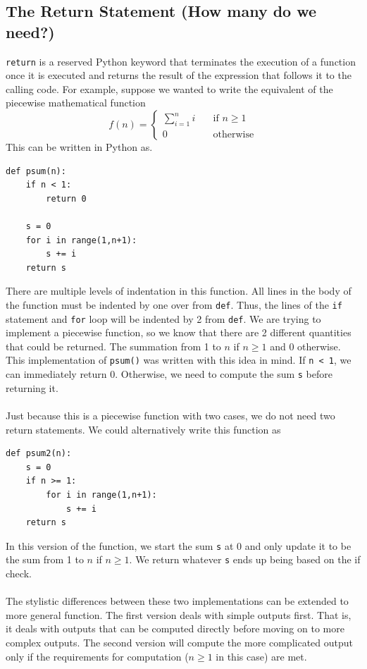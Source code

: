 \documentclass{article}
\begin{document}
\subsection{The Return Statement (How many do we need?)}
\texttt{return} is a reserved Python keyword that terminates the execution of a function once it is executed and returns the result of the expression that follows it to the calling code. For example, suppose we wanted to write the equivalent of the piecewise mathematical function
\begin{equation*}
    f(n) = \begin{cases}
        \sum_{i=1}^n i \quad &\text{if } n \geq 1 \\ 
        0 \quad &\text{otherwise}
    \end{cases}
\end{equation*}
This can be written in Python as.
\begin{verbatim}
def psum(n):
    if n < 1:
        return 0

    s = 0
    for i in range(1,n+1):
        s += i
    return s
\end{verbatim}
There are multiple levels of indentation in this function. All lines in the body of the function must be indented by one over from \texttt{def}. Thus, the lines of the \texttt{if} statement and \texttt{for} loop will be indented by 2 from \texttt{def}. We are trying to implement a piecewise function, so we know that there are 2 different quantities that could be returned. The summation from 1 to $n$ if $n \geq 1$ and 0 otherwise. This implementation of \texttt{psum()} was written with this idea in mind. If \texttt{n < 1}, we can immediately return 0. Otherwise, we need to compute the sum \texttt{s} before returning it.\\\\
Just because this is a piecewise function with two cases, we do not need two return statements. We could alternatively write this function as
\begin{verbatim}
def psum2(n):
    s = 0
    if n >= 1:
        for i in range(1,n+1):
            s += i
    return s
\end{verbatim}
In this version of the function, we start the sum \texttt{s} at 0 and only update it to be the sum from 1 to $n$ if $n \geq 1$. We return whatever \texttt{s} ends up being based on the if check.\\\\
The stylistic differences between these two implementations can be extended to more general function. The first version deals with simple outputs first. That is, it deals with outputs that can be computed directly before moving on to more complex outputs. The second version will compute the more complicated output only if the requirements for computation ($n \geq 1$ in this case) are met.\\\\
\end{document}
